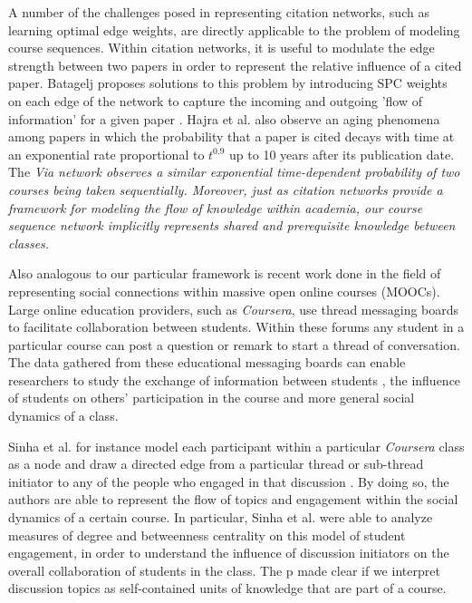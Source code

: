 \documentclass{sigchi}
\begin{document}
A number of the challenges posed in representing citation networks, such as learning optimal edge weights, are directly applicable to the problem of modeling course sequences. Within citation networks, it is useful to modulate the edge strength between two papers in order to represent the relative influence of a cited paper. Batagelj proposes solutions to this problem by introducing SPC weights on each edge of the network to capture the incoming and outgoing 'flow of information' for a given paper \cite{Batagelj2003}. Hajra et al. also observe an aging phenomena among papers in which the probability that a paper is cited decays with time at an exponential rate proportional to $t^{0.9}$ up to 10 years after its publication date. The \em{Via} network observes a similar exponential time-dependent probability of two courses being taken sequentially. Moreover, just as citation networks provide a framework for modeling the flow of knowledge within academia, our course sequence network implicitly represents shared and prerequisite knowledge between classes. 

Also analogous to our particular framework is recent work done in the field of representing social connections within massive open online courses (MOOCs). Large online education providers, such as \textit{Coursera}, use thread messaging boards to facilitate collaboration between students. Within these forums any student in a particular course can post a question or remark to start a thread of conversation. The data gathered from these educational messaging boards can enable researchers to study the exchange of information between students \cite{Brinton2016}, the influence of students on others' participation in the course \cite{Sinha2014a} and more general social dynamics of a class.

Sinha et al. for instance model each participant within a particular \textit{Coursera} class as a node and draw a directed edge from a particular thread or sub-thread initiator to any of the people who engaged in that discussion \cite{Sinha2014}. By doing so, the authors are able to represent the flow of topics and engagement within the social dynamics of a certain course. In particular, Sinha et al. were able to analyze measures of degree and betweenness centrality on this model of student engagement, in order to understand the influence of discussion initiators on the overall collaboration of students in the class. The p made clear if we interpret discussion topics as self-contained units of knowledge that are part of a course. 
\end{document}
